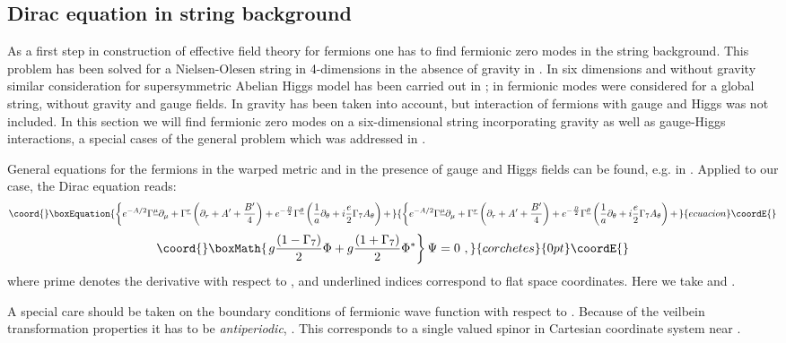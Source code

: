 \documentclass[a4paper,12pt]{article}
\begin{document}
\subsection{Dirac equation in string background} 
As a first step in construction of effective field theory for
fermions one has to find fermionic zero modes in the string
background. This problem has been solved for a Nielsen-Olesen string in
4-dimensions in the absence of gravity in \cite{Jackiw:1981ee}. In
six dimensions and without gravity similar consideration for
supersymmetric Abelian Higgs model has been carried out in
\cite{Hughes:fa}; in \cite{Libanov:2000uf,Frere:2000dc} fermionic
modes were considered for a global string, without gravity and gauge
fields. In \cite{Neronov:2001qv} gravity has been taken into account,
but interaction of fermions with gauge and Higgs was not included. In
this section we will find fermionic zero modes on a six-dimensional
string incorporating gravity as well as gauge-Higgs interactions, a
special cases of the general problem which was addressed in
\cite{Randjbar-Daemi:2000cr}.

General equations for the fermions in the warped metric
and in the presence of gauge and Higgs fields can be found, e.g. in
\cite{Randjbar-Daemi:2000cr}. Applied to our case, the Dirac equation
reads:
\begin{equation}\coord{}\boxEquation{
\left\{
e^{-A/2}\Gamma^{\underline \mu}  \partial_\mu + \Gamma^{\underline r}
\left(\partial_r + A' +\frac{B'}{4}\right)
+e^{-\frac{B}{2}}\Gamma^{\underline\theta}
\left(\frac{1}{a}\partial_\theta
+i\frac{e}{2}\Gamma_7A_\theta\right)+\right.
\label{dirac}
}{
\left\{
e^{-A/2}\Gamma^{\underline \mu}  \partial_\mu + \Gamma^{\underline r}
\left(\partial_r + A' +\frac{B'}{4}\right)
+e^{-\frac{B}{2}}\Gamma^{\underline\theta}
\left(\frac{1}{a}\partial_\theta
+i\frac{e}{2}\Gamma_7A_\theta\right)+\right.
}{ecuacion}\coordE{}\end{equation}
\[\coord{}\boxMath{
\left. g\frac{(1-\Gamma_7)}{2}\Phi +g\frac{(1+\Gamma_7)}{2}\Phi^*
\right\}\Psi =0~,
}{corchetes}{0pt}\coordE{}\]
where prime denotes the derivative with respect to \coordHE{}, and underlined
indices correspond to flat space coordinates. Here we take \coordHE{}
and \coordHE{}.

A special care should be taken on the boundary conditions of
fermionic wave function with respect to \myHighlight{$\theta$}\coordHE{}.  Because of the
veilbein transformation properties it has to be {\it antiperiodic},
\myHighlight{$\Psi(\theta)=-\Psi(\theta+2\pi)$}\coordHE{}. This corresponds to a single valued
spinor in Cartesian coordinate system near \coordHE{}.
\end{document}
